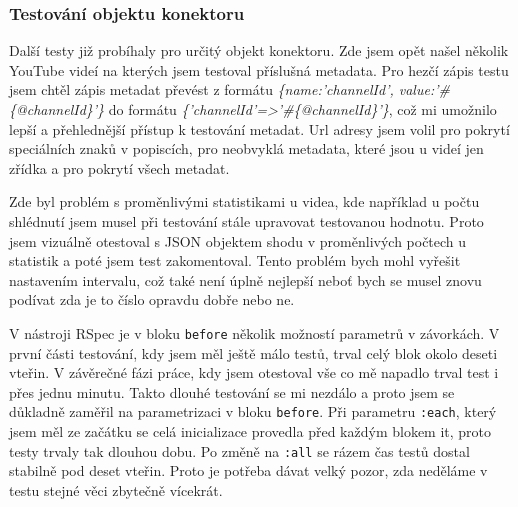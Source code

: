 \subsubsection{Testování objektu konektoru}
\par Další testy již probíhaly pro určitý objekt konektoru. Zde jsem opět našel několik YouTube videí na kterých jsem testoval příslušná metadata. Pro hezčí zápis testu jsem chtěl zápis metadat převést z formátu \textit{\{name:'channelId', value:'\#\{@channelId\}'\}} do formátu \textit{\{'channelId'=>'\#\{@channelId\}'\}}, což mi umožnilo lepší a přehlednější přístup k testování metadat. Url adresy jsem volil pro pokrytí speciálních znaků v popiscích, pro neobvyklá metadata, které jsou u videí jen zřídka a pro pokrytí všech metadat. 
\par Zde byl problém s proměnlivými statistikami u videa, kde například u počtu shlédnutí jsem musel při testování stále upravovat testovanou hodnotu. Proto jsem vizuálně otestoval s JSON objektem shodu v proměnlivých počtech u statistik a poté jsem test zakomentoval. Tento problém bych mohl vyřešit nastavením intervalu, což také není úplně nejlepší neboť bych se musel znovu podívat zda je to číslo opravdu dobře nebo ne.
\par V nástroji RSpec je v bloku \texttt{before} několik možností parametrů v závorkách. V první části testování, kdy jsem měl ještě málo testů, trval celý blok okolo deseti vteřin. V závěrečné fázi práce, kdy jsem otestoval vše co mě napadlo trval test i přes jednu minutu. Takto dlouhé testování se mi nezdálo a proto jsem se důkladně zaměřil na parametrizaci v bloku \texttt{before}. Při parametru \texttt{:each}, který jsem měl ze začátku se celá inicializace provedla před každým blokem it, proto testy trvaly tak dlouhou dobu. Po změně na \texttt{:all} se rázem čas testů dostal stabilně pod deset vteřin. Proto je potřeba dávat velký pozor, zda neděláme v testu stejné věci zbytečně vícekrát.
